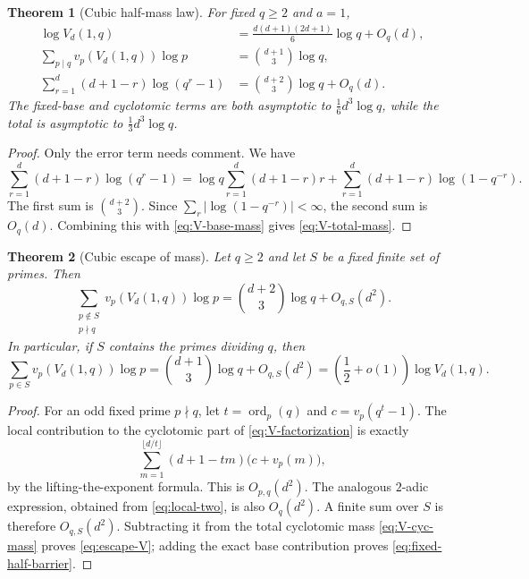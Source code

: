 \documentclass[11pt]{article}
\newtheorem{theorem}{Theorem}[section]
\theoremstyle{definition}
\theoremstyle{remark}
\newcommand{\ord}{\operatorname{ord}}
\begin{document}
\begin{theorem}[Cubic half-mass law]\label{thm:half-mass-V}
For fixed $q\geq2$ and $a=1$,
\begin{align}
 \log V_d(1,q)
 &=\frac{d(d+1)(2d+1)}6\log q+O_q(d),
 \label{eq:V-total-mass}\\
 \sum_{p\mid q}v_p(V_d(1,q))\log p
 &=\binom{d+1}{3}\log q,\label{eq:V-base-mass}\\
 \sum_{r=1}^{d}(d+1-r)\log(q^r-1)
 &=\binom{d+2}{3}\log q+O_q(d).
 \label{eq:V-cyc-mass}
\end{align}
The fixed-base and cyclotomic terms are both asymptotic to
$\frac16d^3\log q$, while the total is asymptotic to
$\frac13d^3\log q$.
\end{theorem}

\begin{proof}
Only the error term needs comment.  We have
\[
 \sum_{r=1}^{d}(d+1-r)\log(q^r-1)
 =\log q\sum_{r=1}^{d}(d+1-r)r
  +\sum_{r=1}^{d}(d+1-r)\log(1-q^{-r}).
\]
The first sum is $\binom{d+2}{3}$.  Since
$\sum_r|\log(1-q^{-r})|<\infty$, the second sum is $O_q(d)$.
Combining this with \eqref{eq:V-base-mass} gives
\eqref{eq:V-total-mass}.
\end{proof}

\begin{theorem}[Cubic escape of mass]\label{thm:escape-V}
Let $q\geq2$ and let $S$ be a fixed finite set of primes.  Then
\begin{equation}\label{eq:escape-V}
 \sum_{\substack{p\notin S\\p\nmid q}}v_p(V_d(1,q))\log p
 =\binom{d+2}{3}\log q+O_{q,S}(d^2).
\end{equation}
In particular, if $S$ contains the primes dividing $q$, then
\begin{equation}\label{eq:fixed-half-barrier}
 \sum_{p\in S}v_p(V_d(1,q))\log p
 =\binom{d+1}{3}\log q+O_{q,S}(d^2)
 =\left(\frac12+o(1)\right)\log V_d(1,q).
\end{equation}
\end{theorem}

\begin{proof}
For an odd fixed prime $p\nmid q$, let $t=\ord_p(q)$ and
$c=v_p(q^t-1)$.  The local contribution to the cyclotomic part of
\eqref{eq:V-factorization} is exactly
\begin{equation}\label{eq:weighted-local-profile}
 \sum_{m=1}^{\lfloor d/t\rfloor}(d+1-tm)\bigl(c+v_p(m)\bigr),
\end{equation}
by the lifting-the-exponent formula.  This is $O_{p,q}(d^2)$.  The analogous
$2$-adic expression, obtained from \eqref{eq:local-two}, is also $O_q(d^2)$.
A finite sum over $S$ is therefore $O_{q,S}(d^2)$.  Subtracting it from the
total cyclotomic mass \eqref{eq:V-cyc-mass} proves
\eqref{eq:escape-V}; adding the exact base contribution proves
\eqref{eq:fixed-half-barrier}.
\end{proof}
\end{document}
